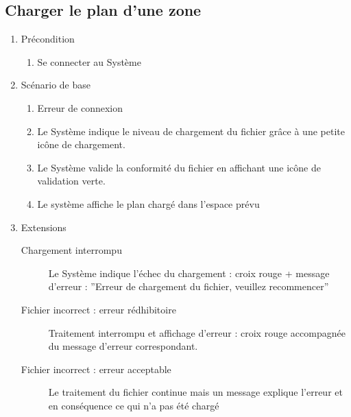 \subsection{Charger le plan d'une zone}
\begin{enumerate}
\item Précondition
\begin{enumerate}
\item 
Se connecter au Système
\end{enumerate}


\item Scénario de base
\begin{enumerate}
\item Erreur de connexion
\item Le Système indique le niveau de chargement du fichier grâce à une petite icône de chargement.
\item Le Système valide la conformité du fichier en affichant une icône de validation verte.
\item Le système affiche le plan chargé dans l’espace prévu
\end{enumerate}

\item Extensions
\begin{description}
\item [Chargement interrompu] Le Système indique l’échec du chargement : croix rouge + message d’erreur : ”Erreur de chargement du fichier, veuillez recommencer”
\item [Fichier incorrect : erreur rédhibitoire] Traitement interrompu et affichage d’erreur :  croix rouge accompagnée du message d’erreur correspondant.
\item [Fichier incorrect : erreur acceptable]
Le traitement du fichier continue mais un message explique l’erreur et en conséquence ce qui n’a pas été chargé 
\end{description}
\end{enumerate}


